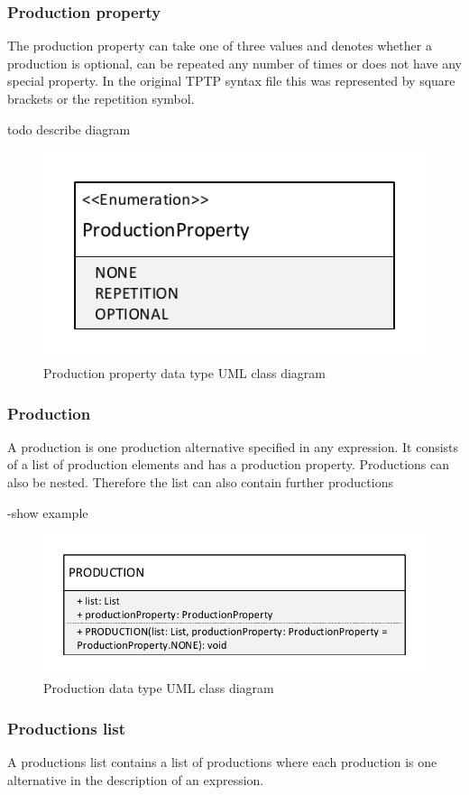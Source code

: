 \subsubsection{Production property}
The production property can take one of three values and denotes whether a production is optional, can be repeated any number of times or does not have any special property.
In the original \ac{TPTP} syntax file this was represented by square brackets or the repetition symbol.

todo describe diagram
\begin{figure}[H]
\centering
\includegraphics[width=.4\textwidth]{images/Concept_uml_data_types_production_property.pdf}
\caption{Production property data type UML class diagram}
\label{fig:ConceptProductionPropertyClassDiagram}
\end{figure}

\subsubsection{Production}
A production is one production alternative specified in any expression.
It consists of a list of production elements and has a production property. Productions can also be nested.
Therefore the list can also contain further productions

-show example
\begin{figure}[H]
\centering
\includegraphics[width=.5\textwidth]{images/Concept_uml_data_types_production.pdf}
\caption{Production data type UML class diagram}
\label{fig:ConceptProductionClassDiagram}
\end{figure}

\subsubsection{Productions list}
A productions list contains a list of productions where each production is one alternative in the description of an expression.


